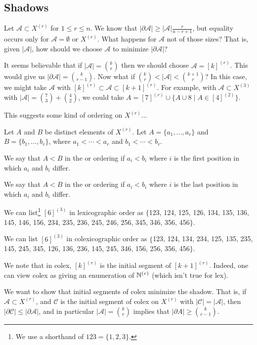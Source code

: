 \documentclass[a4paper]{scrartcl}
\newcommand{\A}{\mathcal{A}}
\begin{document}
\subsection{Shadows}

Let $\A \subset X^{(r)}$ for $1 \leq r \leq n$. We know that $|\partial \A| \geq |\A| \frac{r}{n - r + 1}$, but equality occurs only for $\A = \emptyset$ or $X^{(r)}$. What happens for $\A$ not of those sizes? That is, given $|\A|$, how should we choose $\A$ to minimize $|\partial \A|$?

It seems believable that if $|\A| = \binom{k}{r}$ then we should choose $\A = [k]^{(r)}$. This would give us $|\partial \A| = \binom{k}{r - 1}$. Now what if $\binom{k}{r} < |\A| < \binom{k + 1}{r}$? In this case, we might take $\A$ with $[k]^{(r)} \subset \A \subset [k+1]^{(r)}$. For example, with $\A \subset X^{(3)}$ with $|\A| = \binom{7}{3} + \binom{4}{2}$, we could take $A = [7]^{(r)} \cup \{A \cup 8 \mid A \in [4]^{(2)}\}$.

This suggests some kind of ordering on $X^{(r)}$...

\begin{definition}[Ordering $X^{(r)}$]
    Let $A$ and $B$ be distinct elements of $X^{(r)}$. Let $A = \{a_1, \dots, a_r\}$ and $B = \{b_1, \dots, b_r\}$, where $a_1 < \cdots < a_r$ and $b_1 < \cdots < b_r$.

    We say that $A < B$ in the  or  ordering if 
    $a_i < b_i$ where $i$ is the first position in which $a_i$ and $b_i$ differ.

    We say that $A < B$ in the  or  ordering if $a_i < b_i$ where $i$ is the last position in which $a_i$ and $b_i$ differ.
\end{definition}

\begin{example}
We can list\footnote{We use a shorthand of $123 = \{1, 2, 3\}$.} $[6]^{(3)}$ in lexicographic order as $\{$123, 124, 125, 126, 134, 135, 136, 145, 146, 156, 234, 235, 236, 245, 246, 256, 345, 346, 356, 456$\}$.
\end{example}

\begin{example}
We can list $[6]^{(3)}$ in colexicographic order as $\{$123, 124, 134, 234, 125, 135, 235, 145, 245, 345, 126, 136, 236, 145, 245, 346, 156, 256, 356, 456$\}$.
\end{example}

We note that in colex, $[k]^{(r)}$ is the initial segment of $[k + 1]^{(r)}$. Indeed, one can view colex as giving an enumeration of $\mathbb{N}^{(r)}$ (which isn't true for lex). 

We want to show that initial segments of colex minimize the shadow. That is, if $\A \subset X^{(r)}$, and $\mathcal{C}$ is the initial segment of colex on $X^{(r)}$ with $|\mathcal{C}| = |\A|$, then $|\partial \mathcal{C}| \leq |\partial \mathcal{A}|$, and in particular $|\A| = \binom{k}{r}$ implies that $|\partial A| \geq \binom{k}{r - 1}$.
\end{document}

